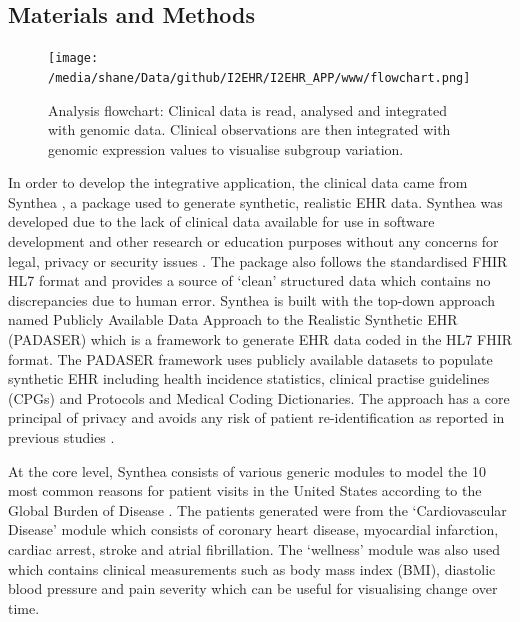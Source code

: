 \documentclass{bioinfo}
\begin{document}
\begin{methods}
\section{Materials and Methods}
\begin{figure}
\texttt{[image: /media/shane/Data/github/I2EHR/I2EHR\_APP/www/flowchart.png]}
\caption{Analysis flowchart: Clinical data is read, analysed and integrated with genomic data. Clinical observations are then integrated with genomic expression values to visualise subgroup variation.}
\end{figure}

In order to develop the integrative application, the clinical data came from Synthea \citep{Synthea}, a package used to generate synthetic, realistic EHR data. Synthea was developed due to the lack of clinical data available for use in software development and other research or education purposes without any concerns for legal, privacy or security issues \cite{Synthea}. The package also follows the standardised FHIR HL7 format and provides a source of `clean' structured data which contains no discrepancies due to human error. Synthea is built with the top-down approach named Publicly Available Data Approach to the Realistic Synthetic EHR (PADASER) which is a framework to generate EHR data coded in the HL7 FHIR format. The PADASER framework uses publicly available datasets to populate synthetic EHR including health incidence statistics, clinical practise guidelines (CPGs) and Protocols and Medical Coding Dictionaries. The approach has a core principal of privacy and avoids any risk of patient re-identification as reported in previous studies \citep{ElEmam2011}.  

At the core level, Synthea consists of various generic modules to model the 10 most common reasons for patient visits in the United States according to the Global Burden of Disease \citep{Synthea}. The patients generated were from the `Cardiovascular Disease' module which consists of coronary heart disease, myocardial infarction, cardiac arrest, stroke and atrial fibrillation. The `wellness' module was also used which contains clinical measurements such as body mass index (BMI), diastolic blood pressure and pain severity which can be useful for visualising change over time. 


\end{methods}
\end{document}

